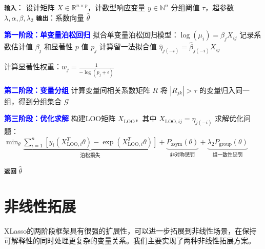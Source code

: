 \documentclass[12pt,a4paper]{article}
\newcommand{\algstage}[1]{\textbf{\textcolor{blue}{#1}}}
\newcommand{\algio}[1]{\textbf{\texttt{#1}}}
\begin{document}
\begin{algorithm}[htbp]
\centering
\caption{泊松广义线性模型下的XLasso算法}
\label{alg:xlasso_poisson}
\vspace{0.5em}
\begin{algorithmic}[1]
\renewcommand{\algorithmiccomment}[1]{\hfill// \textit{#1}}

\STATE \algio{输入}：
\STATE \quad 设计矩阵 $X \in \mathbb{R}^{n \times p}$，计数型响应变量 $y \in \mathbb{N}^n$
\STATE \quad 分组阈值 $\tau$，超参数 $\lambda, \alpha, \beta, \lambda_2$
\STATE \algio{输出}：系数向量 $\hat{\theta}$

\vspace{0.3em}
\STATE \algstage{第一阶段：单变量泊松回归}
    \STATE 拟合单变量泊松回归模型：$\log(\mu_i) = \beta_j X_{ij}$
    \STATE 记录系数估计值 $\beta_j$ 和显著性 $p$ 值 $p_j$
    \STATE 计算留一法拟合值 $\hat{\eta}_{j(-i)} = \hat{\beta}_{j(-i)} X_{ij}$ 
\ENDFOR

\STATE 计算显著性权重：$w_j = \frac{1}{-\log(p_j + \epsilon)}$ 

\vspace{0.3em}
\STATE \algstage{第二阶段：变量分组}
\STATE 计算变量间相关系数矩阵 $R$
\STATE 将 $|R_{jk}| > \tau$ 的变量归入同一组，得到分组集合 $\mathcal{G}$

\vspace{0.3em}
\STATE \algstage{第三阶段：优化求解}
\STATE 构建LOO矩阵 $X_{\text{LOO}}$，其中 $X_{\text{LOO},ij} = \hat{\eta}_{j(-i)}$
\STATE 求解优化问题：
\STATE \quad $\min_{\theta} \underbrace{\sum_{i=1}^n \left[ y_i (X_{\text{LOO},i}^T \theta) - \exp(X_{\text{LOO},i}^T \theta) \right]}_{\text{泊松损失}} + \underbrace{P_{\text{asym}}(\theta)}_{\text{非对称惩罚}} + \underbrace{\lambda_2 P_{\text{group}}(\theta)}_{\text{组一致性惩罚}}$

\STATE \algio{返回} $\hat{\theta}$
\end{algorithmic}
\end{algorithm}

\section{非线性拓展}

XLasso的两阶段框架具有很强的扩展性，可以进一步拓展到非线性场景，在保持可解释性的同时处理更复杂的变量关系。我们主要实现了两种非线性拓展方案。
\end{document}
